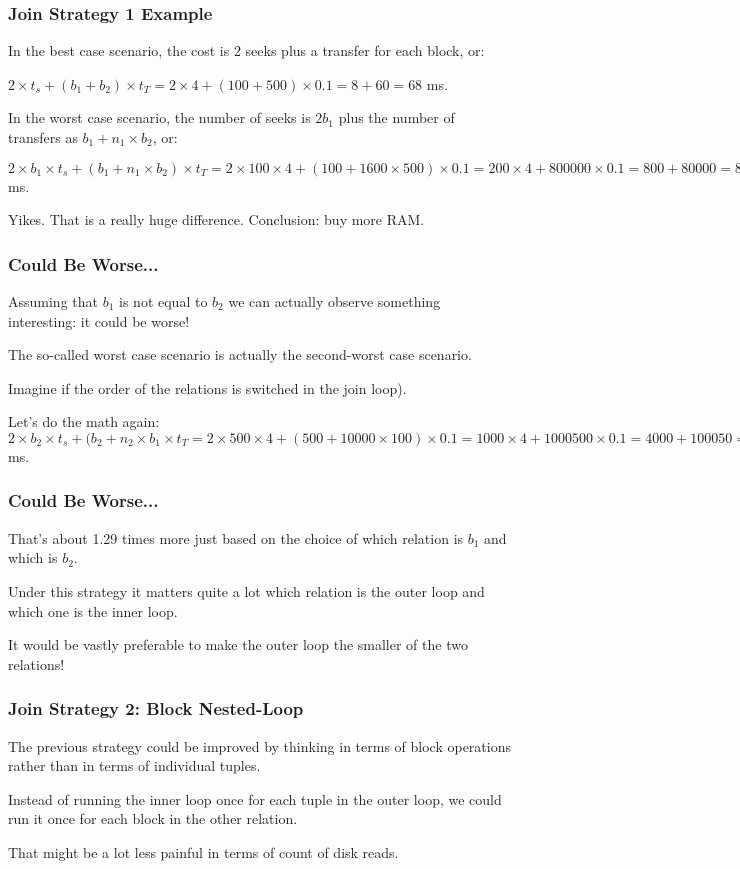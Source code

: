 \begin{frame}
\frametitle{Join Strategy 1 Example}

In the best case scenario, the cost is 2 seeks plus a transfer for each block, or: 

$2 \times t_{s} + (b_{1} + b_{2}) \times t_{T} = 2 \times 4 + (100 + 500) \times 0.1 = 8 + 60 = 68$ ms. 

In the worst case scenario, the number of seeks is $2b_{1}$ plus the number of transfers as $b_{1} + n_{1} \times b_{2}$, or: 

$2 \times b_{1} \times t_{s} + (b_{1} + n_{1} \times b_{2}) \times t_{T} = 2 \times 100 \times 4 + (100 + 1600 \times 500) \times 0.1 = 200 \times 4 + 800000 \times 0.1 = 800 + 80000 = 80800$ ms. 

Yikes. That is a really huge difference. Conclusion: buy more RAM.

\end{frame}

\begin{frame}
\frametitle{Could Be Worse...}
Assuming that $b_{1}$ is not equal to $b_{2}$ we can actually observe something interesting: it could be worse!

 The so-called worst case scenario is actually the second-worst case scenario. 
 
Imagine if the order of the relations is switched in the join loop). 

Let's do the math again: $2 \times b_{2} \times t_{s} + (b_{2} + n_{2} \times b_{1} \times t_{T} = 2 \times 500 \times 4 + (500 + 10000 \times 100) \times 0.1 = 1000 \times 4 + 1000500 \times 0.1 = 4000 + 100050 = 104050$ ms. 

\end{frame}

\begin{frame}
\frametitle{Could Be Worse...}
 That's about 1.29 times more just based on the choice of which relation is $b_{1}$ and which is $b_{2}$.
 
 Under this strategy it matters quite a lot which relation is the outer loop and which one is the inner loop. 
 
 It would be vastly preferable to make the outer loop the smaller of the two relations!

\end{frame}

\begin{frame}
\frametitle{Join Strategy 2: Block Nested-Loop}

The previous strategy could be improved by thinking in terms of block operations rather than in terms of individual tuples. 

Instead of running the inner loop once for each tuple in the outer loop, we could run it once for each block in the other relation. 

That might be a lot less painful in terms of count of disk reads. 

\end{frame}

